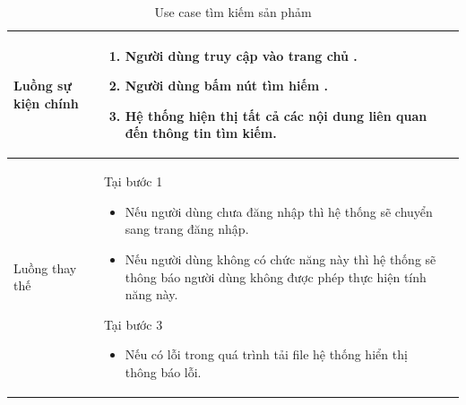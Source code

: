 \documentclass[12pt,a4paper]{article}
\begin{document}
\begin{table}[H]
\begin{tabular}{|p{3.5cm}|p{11.5cm}|c|}
            Luồng sự kiện chính & \vspace{-.8cm}\begin{enumerate}
                                                    \item Người dùng truy cập vào trang chủ .
                                                    \item Người dùng bấm nút tìm hiếm .
                                                    \item Hệ thống hiện thị tất cả các nội dung liên quan đến thông tin tìm kiếm.
            \end{enumerate}
            \\
            \hline
            Luồng thay thế & Tại bước 1\newline
            \vspace{-.8cm}\begin{itemize}
                              \item Nếu người dùng chưa đăng nhập thì hệ thống sẽ chuyển sang trang đăng nhập.
                              \item Nếu người dùng không có chức năng này thì hệ thống sẽ thông báo người dùng không được phép thực hiện tính năng này.
            \end{itemize}
            Tại bước 3\newline
            \vspace{-.8cm}\begin{itemize}
                              \item Nếu có lỗi trong quá trình tải file hệ thống hiển thị thông báo lỗi.
            \end{itemize}
            \\ \hline
        \end{tabular}
        \caption{Use case tìm kiếm sản phảm}

    \end{table}


\end{document}
